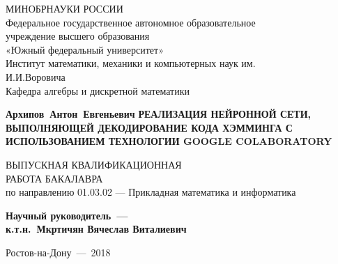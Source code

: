 \normalsize

\thispagestyle{empty}
\begin{titlepage}
\begin{center}

\vfill
МИНОБРНАУКИ РОССИИ\\
\vspace*{0.3cm}
Федеральное государственное автономное образовательное\\
учреждение высшего образования\\
«Южный федеральный университет»\\
\vspace*{0.3cm}
Институт математики, механики и компьютерных наук им.\\
И.И.Воровича\\
Кафедра алгебры и дискретной математики
\vfill

\bigskip

{\large\bf Архипов~Антон~Евгеньевич}
\vfill
{\large\bf РЕАЛИЗАЦИЯ НЕЙРОННОЙ СЕТИ, ВЫПОЛНЯЮЩЕЙ ДЕКОДИРОВАНИЕ КОДА ХЭММИНГА С ИСПОЛЬЗОВАНИЕМ ТЕХНОЛОГИИ GOOGLE COLABORATORY}

\fontsize{14}{16pt}\selectfont

\vfill
ВЫПУСКНАЯ КВАЛИФИКАЦИОННАЯ\\ РАБОТА БАКАЛАВРА\\
по направлению 01.03.02 — Прикладная математика и информатика
\vfill

{\bf Научный руководитель~---\\
к.т.н.~Мкртичян Вячеслав Виталиевич}

\vfill

\end{center}

\bigskip

\begin{center}
Ростов-на-Дону~---~2018
\end{center}

\end{titlepage} 